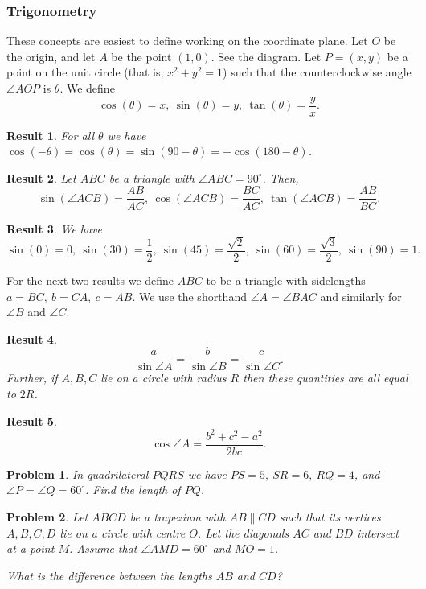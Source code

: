 \documentclass{amsart}
\newtheorem{problem}{Problem}[subsubsection]
\newtheorem{result}{Result}[subsubsection]
\begin{document}
\subsubsection{Trigonometry}
These concepts are easiest to define working on the coordinate plane. Let $O$ be
the origin, and let $A$ be the point $(1,0)$. See the diagram.
Let $P=(x,y)$ be a point on the unit circle (that is, $x^2+y^2=1$) such that
the counterclockwise angle $\angle AOP$ is $\theta$. We define
\[\cos(\theta)=x,\ \sin(\theta)=y,\ \tan(\theta)=\frac yx.\]
\begin{result}{\label{r:b:g:t:1}}
  For all $\theta$ we have
  $\cos(-\theta)=\cos(\theta)=\sin(90-\theta)=-\cos(180-\theta)$.
\end{result}
\begin{result}{\label{r:b:g:t:2}}
  Let $ABC$ be a triangle with $\angle ABC=90^\circ$. Then,
  \[\sin(\angle ACB)=\frac{AB}{AC},\ \cos(\angle ACB)=\frac{BC}{AC},\
    \tan(\angle ACB)=\frac{AB}{BC}.\]
\end{result}
\begin{result}{\label{r:b:g:t:3}}
  We have
  \[\sin(0)=0,\ \sin(30)=\frac 12,\ \sin(45)=\frac{\sqrt2}2,\
    \sin(60)=\frac{\sqrt3}2,\ \sin(90)=1.\]
\end{result}
For the next two results we define $ABC$ to be a triangle with sidelengths
$a=BC,\ b=CA,\ c=AB$. We use the shorthand $\angle A=\angle BAC$ and similarly
for $\angle B$ and $\angle C$.
\begin{result}{\label{r:b:g:t:4}}
  \[\frac a{\sin \angle A}=\frac b{\sin\angle B}=\frac c{\sin\angle C}.\]
  Further, if $A,B,C$ lie on a circle with radius $R$ then these quantities are
  all equal to $2R$.
\end{result}
\begin{result}{\label{r:b:g:t:5}}
  \[\cos\angle A=\frac{b^2+c^2-a^2}{2bc}.\]
\end{result}
\begin{problem}{\label{p:b:g:t:1}}
 In quadrilateral $PQRS$ we have $PS=5,\ SR=6,\ RQ=4$, and $\angle P=\angle
 Q=60^\circ$. Find the length of $PQ$.
\end{problem}
\begin{problem}{\label{p:b:g:t:2}}
  Let $ABCD$ be a trapezium with $AB\|CD$ such that its vertices $A,B,C,D$ lie
  on a circle with centre $O$. Let the diagonals $AC$ and $BD$ intersect at a
  point $M$. Assume that $\angle AMD=60^\circ$ and $MO=1$.

  What is the difference between the lengths $AB$ and $CD$?
\end{problem}
\end{document}
